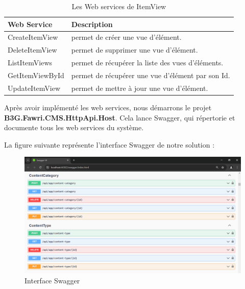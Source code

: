 \begin{table}[H]
    \centering
    \begin{tabular}{|m{5cm}|m{10cm}|}
        \hline
        \textbf{Web Service} & \textbf{Description}                              \\
        \hline
        CreateItemView       & permet de créer une vue d'élément.                \\
        \hline

        DeleteItemView       & permet de supprimer une vue d'élément.            \\
        \hline

        ListItemViews        & permet de récupérer la liste des vues d'éléments. \\
        \hline

        GetItemViewById      & permet de récupérer une vue d'élément par son Id. \\
        \hline

        UpdateItemView       & permet de mettre à jour une vue d'élément.        \\

        \hline
    \end{tabular}
    \caption{Les Web services de ItemView}
    \label{tab:my_label}
\end{table}



Après avoir implémenté les web services, nous démarrons le projet \textbf{B3G.Fawri.CMS.HttpApi.Host}. Cela lance Swagger, qui répertorie et documente tous les web services du système.

La figure suivante représente l’interface Swagger de notre solution :


\begin{figure}[H]
    \centering
    \includegraphics[width=18cm]{Figures/swagger apis.PNG}
    \caption{Interface Swagger}
\end{figure}


